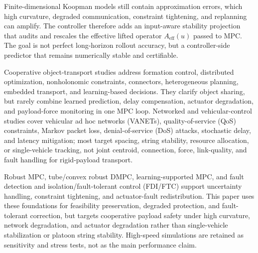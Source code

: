 \documentclass[twocolumn,3p,times,procedia]{elsarticle}
\begin{document}
Finite-dimensional Koopman models still contain approximation errors, which high curvature, degraded communication, constraint tightening, and replanning can amplify. The controller therefore adds an input-aware stability projection that audits and rescales the effective lifted operator $A_{\mathrm{eff}}(u)$ passed to MPC. The goal is not perfect long-horizon rollout accuracy, but a controller-side predictor that remains numerically stable and certifiable.

Cooperative object-transport studies address formation control, distributed optimization, nonholonomic constraints, connectors, heterogeneous planning, embedded transport, and learning-based decisions\cite{an2023multiRobotCommTransport,cooperativeTransport2024ras,gong2023sixDofTransport,zhang2024heterogeneousTransport,embeddedFormationTransport2024cep,multiObjectiveTransport2024mechatronics,intelligentCollaborativeTransport2024}. They clarify object sharing, but rarely combine learned prediction, delay compensation, actuator degradation, and payload-force monitoring in one MPC loop. Networked and vehicular-control studies cover vehicular ad hoc networks (VANETs), quality-of-service (QoS) constraints, Markov packet loss, denial-of-service (DoS) attacks, stochastic delay, and latency mitigation\cite{tan2022mlVehicularDcn,zhao2025blockchainVanetDcn,wu2025drlVecDcn,bian2025markovPacketLossDMPC,dosDMPC2024isa,robustCommunicationLoss2025trb,bai2023robustLongitudinalDMPC,bao2024robustUkfMpc,networkLatencyCav2024sensors,dai2024networkedPredictiveControl}; most target spacing, string stability, resource allocation, or single-vehicle tracking, not joint centroid, connection, force, link-quality, and fault handling for rigid-payload transport.

Robust MPC, tube/convex robust DMPC, learning-supported MPC, and fault detection and isolation/fault-tolerant control (FDI/FTC) support uncertainty handling, constraint tightening, and actuator-fault redistribution\cite{mayne2000constrainedMpc,mayne2005robustMpc,convexRobustDMPC2025ejc,gasparino2023nnMpcUncertainty,liu2024adaptiveFtcSbw,xu2024fdFtcSteering}. This paper uses these foundations for feasibility preservation, degraded protection, and fault-tolerant correction, but targets cooperative payload safety under high curvature, network degradation, and actuator degradation rather than single-vehicle stabilization or platoon string stability. High-speed simulations are retained as sensitivity and stress tests, not as the main performance claim.
\end{document}
